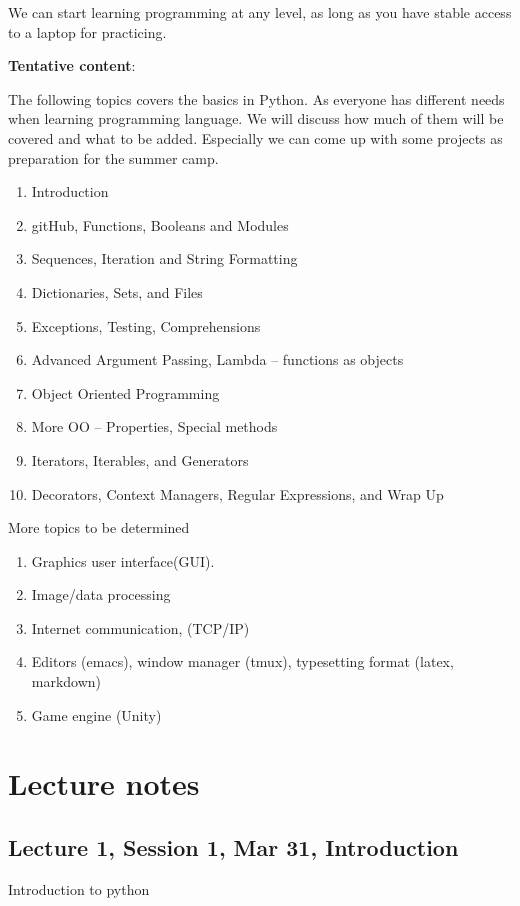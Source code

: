 \documentclass[aps,prb,12pt,tightenlines,%
notitlepage,longbibliography]{revtex4-1}
\begin{document}
We can start learning programming at any level, as long as you have
stable access to a laptop for practicing.

\newpage
\textbf{Tentative content}:

The following topics covers the basics in Python.
As everyone has
different needs when learning programming language. We will discuss
how much of them will be covered and what to be added. Especially we
can come up with some projects as preparation for the summer camp.

\begin{enumerate}

\item  Introduction
\item   gitHub, Functions, Booleans and Modules
\item   Sequences, Iteration and String Formatting
\item   Dictionaries, Sets, and Files
\item   Exceptions, Testing, Comprehensions
\item   Advanced Argument Passing, Lambda -- functions as objects
\item   Object Oriented Programming
\item   More OO -- Properties, Special methods
\item  Iterators, Iterables, and Generators
\item   Decorators, Context Managers, Regular Expressions, and Wrap Up
  
\end{enumerate}

More topics to be determined
\begin{enumerate}
\item
  Graphics user interface(GUI).
\item
  Image/data processing
\item
  Internet communication, (TCP/IP)
\item
  Editors (emacs), window manager (tmux), typesetting format (latex,
  markdown)
\item
  Game engine (Unity)
\end{enumerate}

\newpage
\section{Lecture notes}

\tableofcontents

\subsection{Lecture 1, Session 1, Mar 31, Introduction}
Introduction to python
\end{document}
